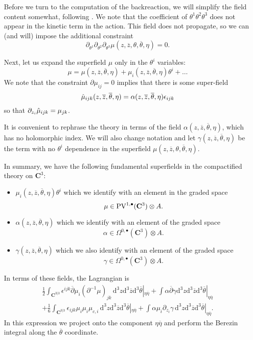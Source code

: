 \documentclass[11pt]{amsart}
\newcommand{\dbar}{\br{\partial}}
\newcommand{\zbar}{\br{z}}
\newcommand{\PV}{\op{PV}}
\newcommand{\eps}{\epsilon}
\newcommand{\what}{\widehat}
\newcommand{\br}{\overline}
\renewcommand{\d}{\mathrm{d}}
\def\zbar{{\overline{z}}}
\def\PV{{\rm PV}}
\newcommand{\op}{\operatorname}
\def\eps{{\epsilon}}
\def\what{\Hat}
\def\bu{{\bullet}}
\newcommand\C{\mathbf{C}}
\newcommand\beqn{\begin{equation}}
\newcommand\eeqn{\end{equation}}
\theoremstyle{thm}
\numberwithin{equation}{subsection}
\theoremstyle{def}
\theoremstyle{rem}
\begin{document}
Before we turn to the computation of the backreaction, we will simplify the field content somewhat, following \cite{CostelloGaiotto}.  
We note that the coefficient of $\theta^1 \theta^2 \theta^3$ does not appear in the kinetic term in the action.  
This field does not propagate, so we can (and will) impose the additional constraint
\begin{equation}\label{eq:nonprop} 
	\partial_{\theta^1} \partial_{\theta^2} \partial_{\theta^3} \mu (z,\zbar,\theta,\br{\theta},\eta) = 0. 
\end{equation}

Next, let us expand the superfield $\mu$ only in the $\theta^i$ variables:
\begin{equation} 
	\mu = \mu(z,\zbar,\br{\theta},\eta) + \mu_{i}(z,\zbar,\br{\theta},\eta) \theta^i + \dots 
\end{equation}
We note that the constraint $\partial \mu_{ij} = 0$ implies that there is some super-field
\begin{equation} 
	\what{\mu}_{ijk}(z,\zbar,\br{\theta},\eta) = 	\alpha(z,\zbar,\br{\theta},\eta) \eps_{ijk}   
\end{equation}
so that $\partial_{z_i} \what{\mu}_{ijk} = \mu_{jk}$.

It is convenient to rephrase the theory in terms of the field $\alpha(z,\zbar,\br{\theta},\eta)$, which has no holomorphic index. 
We will also change notation and let $\gamma(z,\zbar,\br{\theta},\eta)$ be the term with no $\theta^i$ dependence in the superfield $\mu(z,\zbar,\theta,\br{\theta},\eta)$.  

In summary, we have the following fundamental superfields in the compactified theory on $\C^3$:
\begin{itemize}
\item $\mu_i (z,\zbar,\br{\theta}, \eta) \theta^i$ which we identify with an element in the graded space
\beqn
\mu \in \PV^{1,\bu}(\C^3) \otimes A .
\eeqn
\item $\alpha (z,\zbar,\br \theta, \eta)$ which we identify with an element of the graded space
\beqn
\alpha \in \Omega^{0,\bu}(\C^3) \otimes A .
\eeqn
\item $\gamma(z,\zbar,\br \theta, \eta)$ which we also identify with an element of the graded space
\beqn
\gamma \in \Omega^{0,\bu}(\C^3) \otimes A .
\eeqn
\end{itemize}
In terms of these fields, the Lagrangian is
\begin{multline} 
	\tfrac{1}{2}\int_{\C^{3|3}}   \eps^{ijk} \dbar \mu_{i} (\partial^{-1}  \mu)_{jk} \, \d^3 z \d^3 \zbar \d^3 \br{\theta} |_{\eta \br \eta}   + \int  \alpha \dbar \gamma \d^3 z \d^3 \zbar \d^3 \br{\theta} |_{\eta \br{\eta}} 
	\\
	+ \tfrac{1}{6} \int_{\C^{3|3}}  \eps_{ijk} \mu_{i}\mu_{i} \mu_{c,i} \, \d^3 z \d^3 \br{z} \d^3 \br{\theta} |_{\eta \br{\eta}} + \int  \alpha \mu_i \partial_{z_i}  \gamma \, \d^3 z \d^3 \zbar \d^3 \br{\theta} |_{\eta \br{\eta}} .
\end{multline} 
In this expression we project onto the component $\eta \br \eta$ and perform the Berezin integral along the $\br \theta$ coordinate.
\end{document}
